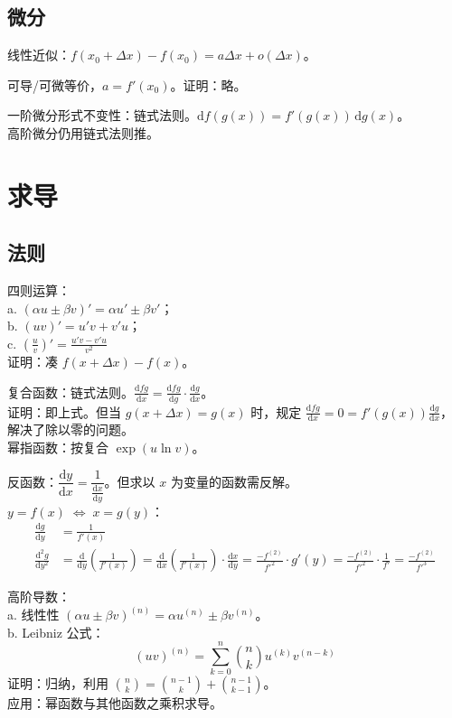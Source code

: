 \documentclass[12pt, a4paper, UTF8, openany]{ctexbook}
\newcommand{\dif}{\mathrm{d}}
\begin{document}
        \subsection{微分}
        线性近似：$f(x_0 + \Delta x) - f(x_0) = a\Delta x + o(\Delta x)$。

        可导/可微等价，$a = f'(x_0)$。证明：略。

        一阶微分形式不变性：链式法则。$\dif f(g(x)) = f'(g(x)) \,\dif g(x)$。\\
        高阶微分仍用链式法则推。

    \section{求导}
        \subsection{法则}
        四则运算：\\
        a. $(\alpha u \pm \beta v)' = \alpha u' \pm \beta v'$；\\
        b. $(uv)' = u'v + v'u$；\\
        c. $\left(\frac{u}{v}\right)' = \frac{u'v - v'u}{v^2}$\\
        证明：凑 $f(x + \Delta x) - f(x)$。

        复合函数：链式法则。$\frac{\dif fg}{\dif x} = \frac{\dif fg}{\dif g} \cdot \frac{\dif g}{\dif x}$。\\
        证明：即上式。但当 $g(x + \Delta x) = g(x)$ 时，规定 $\frac{\dif fg}{\dif x} = 0 = f'(g(x))\frac{\dif g}{\dif x}$，
        解决了除以零的问题。\\
        幂指函数：按复合 $\exp(u \ln v)$。

        反函数：$\dfrac{\dif y}{\dif x} = \dfrac{1}{\frac{\dif x}{\dif y}}$。但求以 $x$ 为变量的函数需反解。\\
        $y = f(x) \; \iff \; x = g(y)$：
        $$\begin{aligned}
            \frac{\dif g}{\dif y} & = \frac{1}{f'(x)} \\
            \frac{\dif^2 g}{\dif y^2} & = \frac{\dif}{\dif y}\left(\frac{1}{f'(x)}\right) 
            = \frac{\dif}{\dif x}\left(\frac{1}{f'(x)}\right) \cdot \frac{\dif x}{\dif y}
            = \frac{-f^{(2)}}{{f'}^2} \cdot g'(y) = \frac{-f^{(2)}}{{f'}^2} \cdot \frac{1}{f'} 
            = \frac{-f^{(2)}}{{f'}^3}
        \end{aligned}$$

        高阶导数：\\
        a. 线性性 $(\alpha u \pm \beta v)^{(n)} = \alpha u^{(n)} \pm \beta v^{(n)}$。\\
        b. Leibniz 公式：
        $$(uv)^{(n)} = \sum_{k = 0}^{n} \binom{n}{k} u^{(k)} v^{(n - k)}$$
        证明：归纳，利用 $\binom{n}{k} = \binom{n - 1}{k} + \binom{n - 1}{k - 1}$。\\
        {\heiti 应用}：幂函数与其他函数之乘积求导。
\end{document}

